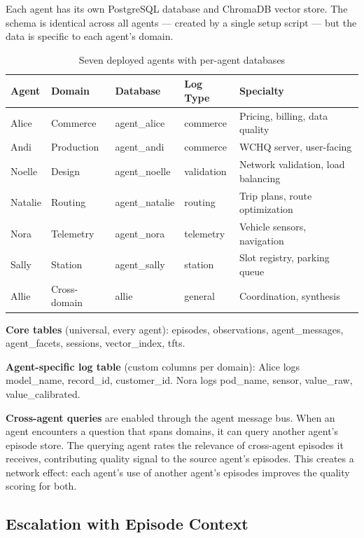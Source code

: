 \documentclass[11pt,a4paper]{article}
\begin{document}
Each agent has its own PostgreSQL database and ChromaDB vector store. The schema is identical across all agents --- created by a single setup script --- but the data is specific to each agent's domain.

\begin{table}[h]
\centering
\small
\begin{tabular}{lllll}
\toprule
\textbf{Agent} & \textbf{Domain} & \textbf{Database} & \textbf{Log Type} & \textbf{Specialty} \\
\midrule
Alice & Commerce & agent\_alice & commerce & Pricing, billing, data quality \\
Andi & Production & agent\_andi & commerce & WCHQ server, user-facing \\
Noelle & Design & agent\_noelle & validation & Network validation, load balancing \\
Natalie & Routing & agent\_natalie & routing & Trip plans, route optimization \\
Nora & Telemetry & agent\_nora & telemetry & Vehicle sensors, navigation \\
Sally & Station & agent\_sally & station & Slot registry, parking queue \\
Allie & Cross-domain & allie & general & Coordination, synthesis \\
\bottomrule
\end{tabular}
\caption{Seven deployed agents with per-agent databases}
\end{table}

\textbf{Core tables} (universal, every agent): episodes, observations, agent\_messages, agent\_facets, sessions, vector\_index, tfts.

\textbf{Agent-specific log table} (custom columns per domain): Alice logs model\_name, record\_id, customer\_id. Nora logs pod\_name, sensor, value\_raw, value\_calibrated.

\textbf{Cross-agent queries} are enabled through the agent message bus. When an agent encounters a question that spans domains, it can query another agent's episode store. The querying agent rates the relevance of cross-agent episodes it receives, contributing quality signal to the source agent's episodes. This creates a network effect: each agent's use of another agent's episodes improves the quality scoring for both.

\subsection{Escalation with Episode Context}
\end{document}

